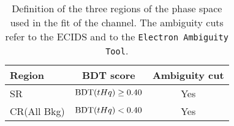 \begin{table}[!htbp]
\centering
 \begin{adjustbox}{max width=0.95\textwidth}
\begin{tabular}{l|c|c}
\toprule
Region     		& \multicolumn{1}{c|}{BDT score}	& Ambiguity cut		\\ \midrule
SR         		& $\text{BDT}(tHq)\geq 0.40$ 		& Yes			\\
CR(All Bkg)	& $\text{BDT}(tHq) < 0.40$ 		& Yes			\\ 
\bottomrule
\end{tabular}
\end{adjustbox}
 \caption{Definition of the three regions of the phase space used in the fit of the 
 \dilepSStau channel. The ambiguity cuts refer to the ECIDS and to the \texttt{Electron Ambiguity Tool}.}
\label{tab:ChaptH:EventSelection:dilepSStau:RegionsSummary}
\end{table}









 




\FloatBarrier
